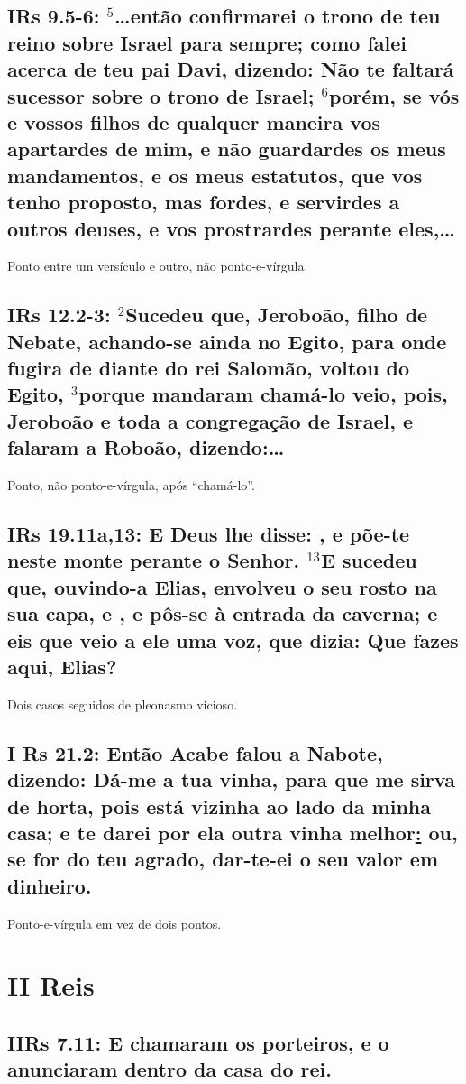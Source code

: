 \subsection{IRs 9.5-6: $^{\mathrm{5}}$\ldots então confirmarei o trono de teu reino sobre Israel para sempre; como falei acerca de teu pai Davi, dizendo: Não te faltará sucessor sobre o trono de Israel\uline{;} $^{\mathrm{6}}$porém, se vós e vossos filhos de qualquer maneira vos apartardes de mim, e não guardardes os meus mandamentos, e os meus estatutos, que vos tenho proposto, mas fordes, e servirdes a outros deuses, e vos prostrardes perante eles,\ldots}
Ponto entre um versículo e outro, não ponto-e-vírgula.

\subsection{IRs 12.2-3: $^{\mathrm{2}}$Sucedeu que, Jeroboão, filho de Nebate, achando-se ainda no Egito, para onde fugira de diante do rei Salomão, voltou do Egito, $^{\mathrm{3}}$porque mandaram chamá-lo\uwave{;} veio, pois, Jeroboão e toda a congregação de Israel, e falaram a Roboão, dizendo:\ldots}
Ponto, não ponto-e-vírgula, após ``chamá-lo''.

\subsection{IRs 19.11a,13: E Deus lhe disse: , e põe-te neste monte perante o Senhor. $^{\mathrm{13}}$E sucedeu que, ouvindo-a Elias, envolveu o seu rosto na sua capa, e , e pôs-se à entrada da caverna; e eis que veio a ele uma voz, que dizia: Que fazes aqui, Elias?}
Dois casos seguidos de pleonasmo vicioso.

\subsection{I Rs 21.2: Então Acabe falou a Nabote, dizendo: Dá-me a tua vinha, para que me sirva de horta, pois está vizinha ao lado da minha casa; e te darei por ela outra vinha melhor\uline{:} ou, se for do teu agrado, dar-te-ei o seu valor em dinheiro.}
Ponto-e-vírgula em vez de dois pontos.

\section{II Reis}
\subsection{IIRs 7.11: E chamaram os porteiros, e o anunciaram dentro da casa do rei.}

